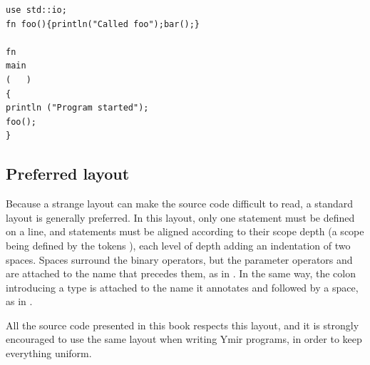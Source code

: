 \begin{lstlisting}[style=coloredverbatim, caption=Arbitrary code layout example]
use std::io;
fn foo(){println("Called foo");bar();}

fn
main
(   )
{
println ("Program started");
foo();
}
\end{lstlisting}

\subsection{Preferred layout}
\label{sec:(chap1):layout}

Because a strange layout can make the source code difficult to read, a standard
layout is generally preferred. In this layout, only one statement must be
defined on a line, and statements must be aligned according to their scope depth
(a scope being defined by the tokens \token{\{\}}), each level of depth adding
an indentation of two spaces. Spaces surround the binary
operators, but the parameter operators \token{()} and \token{[]} are attached to
the name that precedes them, as in . In the same way, the
colon introducing a type is attached to the name it annotates and followed by a
space, as in .

All the source code presented in this book respects this layout, and it is
strongly encouraged to use the same layout when writing Ymir programs, in order
to keep everything uniform.

\vfill
\pagebreak
